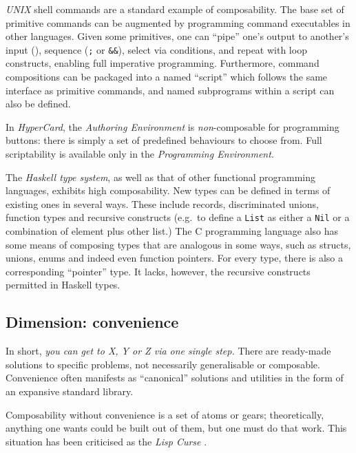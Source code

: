 \documentclass[ twoside,openright,titlepage,numbers=noenddot,headinclude,footinclude,cleardoublepage=empty,abstract=on,
                BCOR=5mm,paper=a4,fontsize=11pt
                ]{scrreprt}
\newcommand{\note}[1]{}
\theoremstyle{definition}
\begin{document}
\emph{UNIX} shell commands are a standard example of composability. The
base set of primitive commands can be augmented by programming command
executables in other languages. Given some primitives, one can ``pipe''
one's output to another's input (\texttt{\textbar{}}), sequence
(\texttt{;} or \texttt{\&\&}), select via conditions, and repeat with
loop constructs, enabling full imperative programming. Furthermore,
command compositions can be packaged into a named ``script'' which
follows the same interface as primitive commands, and named subprograms
within a script can also be defined.

In \emph{HyperCard}, the \emph{Authoring Environment} is
\emph{non}-composable for programming buttons: there is simply a set of
predefined behaviours to choose from. Full scriptability is available
only in the \emph{Programming Environment}.

The \emph{Haskell type system}, as well as that of other functional
programming languages, exhibits high composability. New types can be
defined in terms of existing ones in several ways. These include
records, discriminated unions, function types and recursive constructs
(e.g.~to define a \texttt{List} as either a \texttt{Nil} or a
combination of element plus other list.) The C programming language also
has some means of composing types that are analogous in some ways, such
as structs, unions, enums and indeed even function pointers. For every
type, there is also a corresponding ``pointer'' type. It lacks, however,
the recursive constructs permitted in Haskell types.

\note{*Web* Mashups in Web 2.0? Yahoo Pipes?}

\hypertarget{dimension-convenience}{\subsection{Dimension: convenience}\label{dimension-convenience}}

In short, \emph{you can get to X, Y or Z via one single step.} There are
ready-made solutions to specific problems, not necessarily generalisable
or composable. Convenience often manifests as ``canonical'' solutions
and utilities in the form of an expansive standard library.

Composability without convenience is a set of atoms or gears;
theoretically, anything one wants could be built out of them, but one
must do that work. This situation has been criticised as the \emph{Lisp
Curse} \parencite{LispCurse}.
\end{document}
